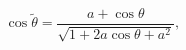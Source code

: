 \begin{equation}
\cos{\widetilde{\theta}}
=\frac{a+\cos\theta}{\sqrt{1+2a\cos\theta+a^2}}, 
\end{equation}

